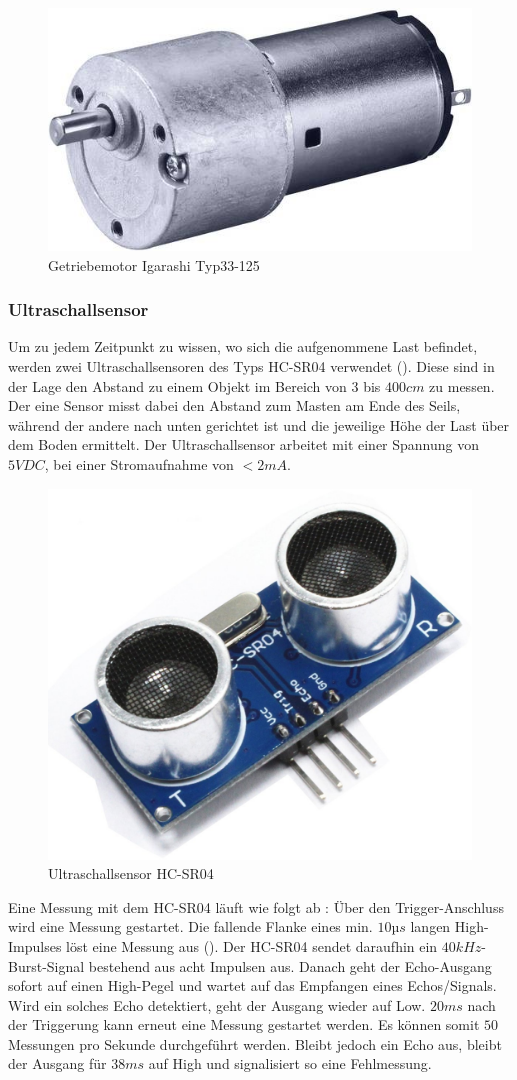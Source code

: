 \begin{figure}
    \centering
    \includegraphics[width=0.5\linewidth]{pics/getriebemotor.jpg}
    \caption{Getriebemotor Igarashi Typ33-125}
    \label{fig:getriebemotor}
\end{figure}

\subsubsection{Ultraschallsensor}

Um zu jedem Zeitpunkt zu wissen, wo sich die aufgenommene Last befindet, werden zwei Ultraschallsensoren des Typs HC-SR04  verwendet (). Diese sind in der Lage den Abstand zu einem Objekt im Bereich von $3$ bis $400cm$ zu messen. Der eine Sensor misst dabei den Abstand zum Masten am Ende des Seils, während der andere nach unten gerichtet ist und die jeweilige Höhe der Last über dem Boden ermittelt. Der Ultraschallsensor arbeitet mit einer Spannung von $5VDC$, bei einer Stromaufnahme von $<2mA$.

\begin{figure}
    \centering
    \includegraphics[width=0.5\linewidth]{pics/ultraschallsensor.jpg}
    \caption{Ultraschallsensor HC-SR04}
    \label{fig:ultraschallsensor}
\end{figure}

Eine Messung mit dem HC-SR04 läuft wie folgt ab : Über den Trigger-Anschluss wird eine Messung gestartet. Die fallende Flanke eines min. $10 µs$ langen High-Impulses löst eine Messung aus (). Der HC-SR04 sendet daraufhin ein $40 kHz$-Burst-Signal bestehend aus acht Impulsen aus. Danach geht der Echo-Ausgang sofort auf einen High-Pegel und wartet auf das Empfangen eines Echos/Signals. Wird ein solches Echo detektiert, geht der Ausgang wieder auf Low. $20 ms$ nach der Triggerung kann erneut eine Messung gestartet werden. Es können somit $50$ Messungen pro Sekunde durchgeführt werden. Bleibt jedoch ein Echo aus, bleibt der Ausgang für $38 ms$ auf High und signalisiert so eine Fehlmessung.

